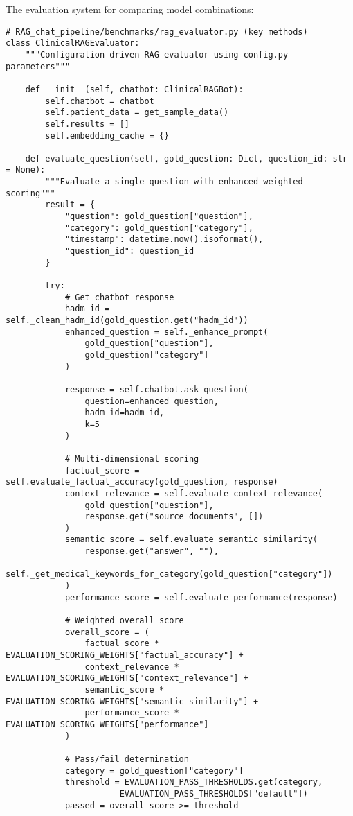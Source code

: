 The evaluation system for comparing model combinations:

\begin{verbatim}
# RAG_chat_pipeline/benchmarks/rag_evaluator.py (key methods)
class ClinicalRAGEvaluator:
    """Configuration-driven RAG evaluator using config.py parameters"""

    def __init__(self, chatbot: ClinicalRAGBot):
        self.chatbot = chatbot
        self.patient_data = get_sample_data()
        self.results = []
        self.embedding_cache = {}

    def evaluate_question(self, gold_question: Dict, question_id: str = None):
        """Evaluate a single question with enhanced weighted scoring"""
        result = {
            "question": gold_question["question"],
            "category": gold_question["category"],
            "timestamp": datetime.now().isoformat(),
            "question_id": question_id
        }

        try:
            # Get chatbot response
            hadm_id = self._clean_hadm_id(gold_question.get("hadm_id"))
            enhanced_question = self._enhance_prompt(
                gold_question["question"], 
                gold_question["category"]
            )

            response = self.chatbot.ask_question(
                question=enhanced_question,
                hadm_id=hadm_id,
                k=5
            )

            # Multi-dimensional scoring
            factual_score = self.evaluate_factual_accuracy(gold_question, response)
            context_relevance = self.evaluate_context_relevance(
                gold_question["question"], 
                response.get("source_documents", [])
            )
            semantic_score = self.evaluate_semantic_similarity(
                response.get("answer", ""), 
                self._get_medical_keywords_for_category(gold_question["category"])
            )
            performance_score = self.evaluate_performance(response)

            # Weighted overall score
            overall_score = (
                factual_score * EVALUATION_SCORING_WEIGHTS["factual_accuracy"] +
                context_relevance * EVALUATION_SCORING_WEIGHTS["context_relevance"] +
                semantic_score * EVALUATION_SCORING_WEIGHTS["semantic_similarity"] +
                performance_score * EVALUATION_SCORING_WEIGHTS["performance"]
            )

            # Pass/fail determination
            category = gold_question["category"]
            threshold = EVALUATION_PASS_THRESHOLDS.get(category, 
                       EVALUATION_PASS_THRESHOLDS["default"])
            passed = overall_score >= threshold


\end{verbatim}
